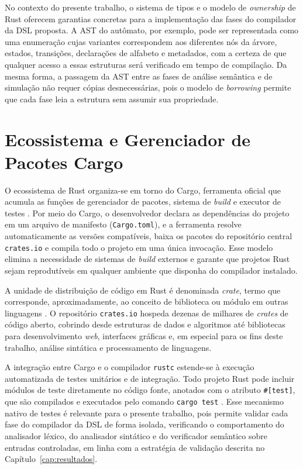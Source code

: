 \documentclass[
    12pt
    ,oneside
    ,a4paper
    ,chapter=TITLE
    ,section=TITLE
    ,sumario=abnt-6027-2012]{abntex2}
\begin{document}
No contexto do presente trabalho, o sistema de tipos e o modelo de \textit{ownership} de Rust
oferecem garantias concretas para a implementação das fases do compilador da DSL proposta. A
AST do autômato, por exemplo, pode ser representada como uma enumeração cujas variantes
correspondem aos diferentes nós da árvore, estados, transições, declarações de alfabeto e
metadados, com a certeza de que qualquer acesso a essas estruturas será verificado em tempo de
compilação. Da mesma forma, a passagem da AST entre as fases de análise semântica e de
simulação não requer cópias desnecessárias, pois o modelo de \textit{borrowing} permite que
cada fase leia a estrutura sem assumir sua propriedade.

\section{Ecossistema e Gerenciador de Pacotes Cargo}
\label{sec:rust-cargo}

O ecossistema de Rust organiza-se em torno do Cargo, ferramenta oficial que acumula as
funções de gerenciador de pacotes, sistema de \textit{build} e executor de testes
\cite{klabnik2019}. Por meio do Cargo, o desenvolvedor declara as dependências do projeto em um
arquivo de manifesto (\texttt{Cargo.toml}), e a ferramenta resolve automaticamente as versões
compatíveis, baixa os pacotes do repositório central \texttt{crates.io} e compila todo o
projeto em uma única invocação. Esse modelo elimina a necessidade de sistemas de \textit{build}
externos e garante que projetos Rust sejam reprodutíveis em qualquer ambiente que disponha do
compilador instalado.

A unidade de distribuição de código em Rust é denominada \textit{crate}, termo que
corresponde, aproximadamente, ao conceito de biblioteca ou módulo em outras linguagens
\cite{klabnik2019}. O repositório \texttt{crates.io} hospeda dezenas de milhares de
\textit{crates} de código aberto, cobrindo desde estruturas de dados e algoritmos até
bibliotecas para desenvolvimento \textit{web}, interfaces gráficas e, em especial para os fins
deste trabalho, análise sintática e processamento de linguagens.

A integração entre Cargo e o compilador \texttt{rustc} estende-se à execução automatizada de
testes unitários e de integração. Todo projeto Rust pode incluir módulos de teste diretamente
no código fonte, anotados com o atributo \texttt{\#[test]}, que são compilados e executados
pelo comando \texttt{cargo test} \cite{klabnik2019}. Esse mecanismo nativo de testes é
relevante para o presente trabalho, pois permite validar cada fase do compilador da DSL de
forma isolada, verificando o comportamento do analisador léxico, do analisador sintático e do
verificador semântico sobre entradas controladas, em linha com a estratégia de validação
descrita no Capítulo~\ref{cap:resultados}.
\end{document}
